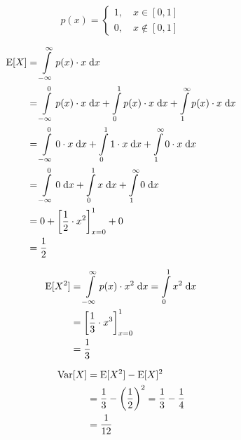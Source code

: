 \[ p(x) = \begin{cases}
    1, \quad x \in [0,1] \\
    0, \quad x \notin [0,1]
\end{cases} \]

\begin{align*}
\mathrm{E}[X] &= \int \limits_{-\infty}^{\infty} p(x) \cdot x \;\mathrm{d} x \\
      &= \int \limits_{-\infty}^{0} p(x) \cdot x \;\mathrm{d} x + \int \limits_{0}^{1} p(x) \cdot x \;\mathrm{d} x + \int \limits_{1}^{\infty} p(x) \cdot x \;\mathrm{d} x \\
      &= \int \limits_{-\infty}^{0} 0 \cdot x \;\mathrm{d} x + \int \limits_{0}^{1} 1 \cdot x \;\mathrm{d} x + \int \limits_{1}^{\infty} 0 \cdot x \;\mathrm{d} x \\
      &= \int \limits_{-\infty}^{0} 0 \;\mathrm{d} x + \int \limits_{0}^{1} x \;\mathrm{d} x + \int \limits_{1}^{\infty} 0 \;\mathrm{d} x \\
      &= 0 + \left[\frac{1}{2} \cdot x^2\right]_{x=0}^1 + 0 \\
      &= \frac{1}{2}
\end{align*}

\begin{align*}
\mathrm{E}[X^2] &= \int \limits_{-\infty}^{\infty} p(x) \cdot x^2 \;\mathrm{d} x
         = \int \limits_0^1 x^2 \;\mathrm{d} x \\
        &= \left[\frac{1}{3} \cdot x^3\right]_{x=0}^1 \\
        &= \frac{1}{3}
\end{align*}

\begin{align*}
\mathrm{Var}[X] &= \mathrm{E}[X^2] - \mathrm{E}[X]^2 \\
        &= \frac{1}{3} - \left(\frac{1}{2}\right)^2
         = \frac{1}{3} - \frac{1}{4} \\
        &= \frac{1}{12}
\end{align*}

